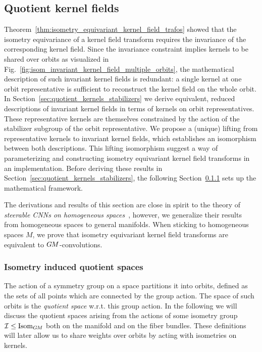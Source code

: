 

\subsection{Quotient kernel fields}
\label{sec:quotient_kernel_fields}


Theorem~\ref{thm:isometry_equivariant_kernel_field_trafos} showed that the isometry equivariance of a kernel field transform requires the invariance of the corresponding kernel field.
Since the invariance constraint implies kernels to be shared over orbits as visualized in Fig.~\ref{fig:isom_invariant_kernel_field_multiple_orbits}, the mathematical description of such invariant kernel fields is redundant:
a single kernel at one orbit representative is sufficient to reconstruct the kernel field on the whole orbit.
In Section~\ref{sec:quotient_kernels_stabilizers} we derive equivalent, reduced descriptions of invariant kernel fields in terms of kernels on orbit representatives.
These representative kernels are themselves constrained by the action of the stabilizer subgroup of the orbit representative.
We propose a (unique) lifting from representative kernels to invariant kernel fields, which establishes an isomorphism between both descriptions.
This lifting isomorphism suggest a way of parameterizing and constructing isometry equivariant kernel field transforms in an implementation.
Before deriving these results in Section~\ref{sec:quotient_kernels_stabilizers}, the following Section~\ref{sec:isom_quotients} sets up the mathematical framework.

The derivations and results of this section are close in spirit to the theory of \emph{steerable CNNs on homogeneous spaces}~\cite{Cohen2018-intertwiners,Cohen2019-generaltheory},
however, we generalize their results from homogeneous spaces to general manifolds.
When sticking to homogeneous spaces $M$, we prove that isometry equivariant kernel field transforms are equivalent to $G\mkern-1.4muM$-convolutions.





\subsubsection{Isometry induced quotient spaces}
\label{sec:isom_quotients}


The action of a symmetry group on a space partitions it into orbits, defined as the sets of all points which are connected by the group action.
The space of such orbits is the \emph{quotient space} w.r.t. this group action.
In the following we will discuss the quotient spaces arising from the actions of some isometry group $\mathcal{I} \leq \operatorname{Isom}_{G\mkern-1.4muM}$ both on the manifold and on the fiber bundles.
These definitions will later allow us to share weights over orbits by acting with isometries on kernels.



